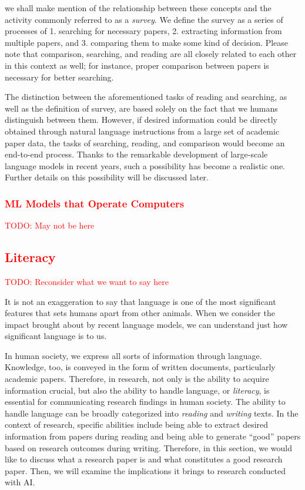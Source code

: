 \documentclass{book}
\begin{document}
we shall make mention of the relationship between these concepts and the activity commonly referred to as a \textit{survey}. We define the survey as a series of processes of 1. searching for necessary papers, 2. extracting information from multiple papers, and 3. comparing them to make some kind of decision. Please note that comparison, searching, and reading are all closely related to each other in this context as well; for instance, proper comparison between papers is necessary for better searching.

The distinction between the aforementioned tasks of reading and searching, as well as the definition of survey, are based solely on the fact that we humans distinguish between them. However, if desired information could be directly obtained through natural language instructions from a large set of academic paper data, the tasks of searching, reading, and comparison would become an end-to-end process. Thanks to the remarkable development of large-scale language models in recent years, such a possibility has become a realistic one. Further details on this possibility will be discussed later.

\subsubsection{\textcolor{red}{ML Models that Operate Computers}}
\textcolor{red}{TODO: May not be here}

\subsection{\textcolor{red}{Literacy}}
\textcolor{red}{TODO: Reconsider what we want to say here}

It is not an exaggeration to say that language is one of the most significant features that sets humans apart from other animals. When we consider the impact brought about by recent language models, we can understand just how significant language is to us.

In human society, we express all sorts of information through language. Knowledge, too, is conveyed in the form of written documents, particularly academic papers. Therefore, in research, not only is the ability to acquire information crucial, but also the ability to handle language, or \textit{literacy}, is essential for communicating research findings in human society. The ability to handle language can be broadly categorized into \textit{reading} and \textit{writing} texts. In the context of research, specific abilities include being able to extract desired information from papers during reading and being able to generate ``good'' papers based on research outcomes during writing. Therefore, in this section, we would like to discuss what a research paper is and what constitutes a good research paper. Then, we will examine the implications it brings to research conducted with AI.
\end{document}
